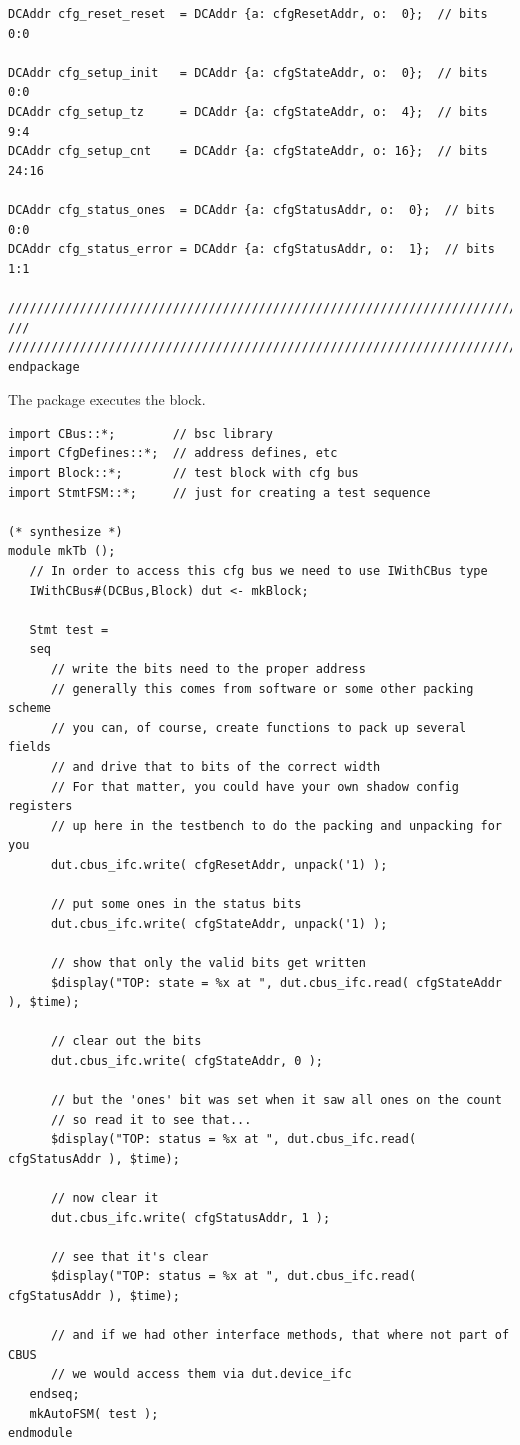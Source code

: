 \begin{verbatim}
DCAddr cfg_reset_reset  = DCAddr {a: cfgResetAddr, o:  0};  // bits 0:0

DCAddr cfg_setup_init   = DCAddr {a: cfgStateAddr, o:  0};  // bits 0:0
DCAddr cfg_setup_tz     = DCAddr {a: cfgStateAddr, o:  4};  // bits 9:4
DCAddr cfg_setup_cnt    = DCAddr {a: cfgStateAddr, o: 16};  // bits 24:16

DCAddr cfg_status_ones  = DCAddr {a: cfgStatusAddr, o:  0};  // bits 0:0
DCAddr cfg_status_error = DCAddr {a: cfgStatusAddr, o:  1};  // bits 1:1

////////////////////////////////////////////////////////////////////////////////
///
////////////////////////////////////////////////////////////////////////////////
endpackage
\end{verbatim}

The  package executes the block.

\begin{verbatim}
import CBus::*;        // bsc library
import CfgDefines::*;  // address defines, etc
import Block::*;       // test block with cfg bus
import StmtFSM::*;     // just for creating a test sequence

(* synthesize *)
module mkTb ();
   // In order to access this cfg bus we need to use IWithCBus type
   IWithCBus#(DCBus,Block) dut <- mkBlock;
   
   Stmt test =
   seq
      // write the bits need to the proper address
      // generally this comes from software or some other packing scheme
      // you can, of course, create functions to pack up several fields
      // and drive that to bits of the correct width
      // For that matter, you could have your own shadow config registers
      // up here in the testbench to do the packing and unpacking for you
      dut.cbus_ifc.write( cfgResetAddr, unpack('1) );

      // put some ones in the status bits
      dut.cbus_ifc.write( cfgStateAddr, unpack('1) );
      
      // show that only the valid bits get written
      $display("TOP: state = %x at ", dut.cbus_ifc.read( cfgStateAddr ), $time);

      // clear out the bits
      dut.cbus_ifc.write( cfgStateAddr, 0 );

      // but the 'ones' bit was set when it saw all ones on the count
      // so read it to see that...
      $display("TOP: status = %x at ", dut.cbus_ifc.read( cfgStatusAddr ), $time);

      // now clear it
      dut.cbus_ifc.write( cfgStatusAddr, 1 );

      // see that it's clear
      $display("TOP: status = %x at ", dut.cbus_ifc.read( cfgStatusAddr ), $time);

      // and if we had other interface methods, that where not part of CBUS
      // we would access them via dut.device_ifc 
   endseq;
   mkAutoFSM( test );
endmodule
\end{verbatim}

